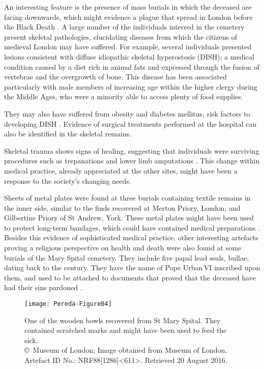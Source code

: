 An interesting feature is the presence of mass burials in which the deceased are facing downwards, which might evidence a plague that spread in London before the Black Death \parencites[61]{Bowers_2007}[252]{Brodman_2009}[73]{Egan_2007}[101]{Thomas_2002}[61]{White_2007}.
A large number of the individuals interred in the cemetery present skeletal pathologies, elucidating diseases from which the citizens of medieval London may have suffered. For example, several individuals presented lesions consistent with diffuse idiopathic skeletal hyperostosis (DISH); a medical condition caused by a diet rich in animal fats and expressed through the fusion of vertebrae and the overgrowth of bone. This disease has been associated particularly with male members of increasing age within the higher clergy during the Middle Ages, who were a minority able to access plenty of food supplies. 

They may also have suffered from obesity and diabetes mellitus, risk factors to developing DISH
\parencites[361-362]{Rogers_2001}{Verlaan_2007}[1763]{Waldron_1985}[62]{White_2007}.
Evidence of surgical treatments performed at the hospital can also be identified in the skeletal remains. 

Skeletal trauma shows signs of healing, suggesting that individuals were surviving procedures such as trepanations and lower limb amputations \parencite[63-64]{White_2007}. This change within medical practice, already appreciated at the other sites, might have been a response to the society’s changing needs.

Sheets of metal plates were found at three burials containing textile remains in the inner side, similar to the finds recovered at Merton Priory, London, and Gilbertine Priory of St Andrew, York. These metal plates might have been used to protect long-term bandages, which could have contained medical preparations \parencite[70-71]{Bowers_2007}. 
Besides this evidence of sophisticated medical practice, other interesting artefacts proving a religious perspective on health and death were also found at some burials of the Mary Spital cemetery. They include five papal lead seals, bullae, dating back to the  century\AD. They have the name of Pope Urban\,VI inscribed upon them, and used to be attached to documents that proved that the deceased have had their sins pardoned \parencites[69]{Phillpotts_1997}[70,72]{White_2007}.

\begin{figure}[!h]
		\texttt{[image: Pereda-Figure04]}
		\caption{One of the wooden bowls recovered from St Mary Spital. They contained scratched marks and might have been used to feed the sick.
		{\normalfont\scriptsize \\ \copyright\ Museum of London; Image obtained from Museum of London. Artefact ID No.: NRF88[1286]<611>. Retrieved 20 August 2016.}}
	\label{fig:Pereda-Figure04}
   \end{figure}

